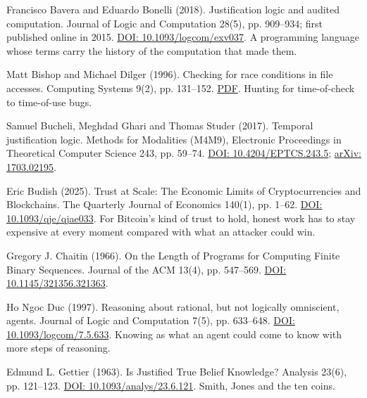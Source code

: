 \documentclass[11pt,twoside]{article}
\theoremstyle{thielethm}
\theoremstyle{thieledef}
\theoremstyle{thieledef}
\theoremstyle{thieledef}
\theoremstyle{thielethm}
\theoremstyle{thieleobs}
\theoremstyle{thielethm}
\begin{document}
\noindent Francisco Bavera and Eduardo Bonelli (2018). Justification logic and audited computation. Journal of Logic and Computation 28(5), pp. 909--934; first published online in 2015. \href{https://doi.org/10.1093/logcom/exv037}{DOI: 10.1093/logcom/exv037}. A programming language whose terms carry the history of the computation that made them.
\par\medskip

\noindent Matt Bishop and Michael Dilger (1996). Checking for race conditions in file accesses. Computing Systems 9(2), pp. 131--152. \href{https://www.usenix.org/legacy/publications/compsystems/1996/spr_bishop.pdf}{PDF}. Hunting for time-of-check to time-of-use bugs.
\par\medskip

\noindent Samuel Bucheli, Meghdad Ghari and Thomas Studer (2017). Temporal justification logic. Methods for Modalities (M4M9), Electronic Proceedings in Theoretical Computer Science 243, pp. 59--74. \href{https://doi.org/10.4204/EPTCS.243.5}{DOI: 10.4204/EPTCS.243.5}; \href{https://arxiv.org/abs/1703.02195}{arXiv: 1703.02195}.
\par\medskip

\noindent Eric Budish (2025). Trust at Scale: The Economic Limits of Cryptocurrencies and Blockchains. The Quarterly Journal of Economics 140(1), pp. 1--62. \href{https://doi.org/10.1093/qje/qjae033}{DOI: 10.1093/qje/qjae033}. For Bitcoin's kind of trust to hold, honest work has to stay expensive at every moment compared with what an attacker could win.
\par\medskip

\noindent Gregory J. Chaitin (1966). On the Length of Programs for Computing Finite Binary Sequences. Journal of the ACM 13(4), pp. 547--569. \href{https://doi.org/10.1145/321356.321363}{DOI: 10.1145/321356.321363}.
\par\medskip

\noindent Ho Ngoc Duc (1997). Reasoning about rational, but not logically omniscient, agents. Journal of Logic and Computation 7(5), pp. 633--648. \href{https://doi.org/10.1093/logcom/7.5.633}{DOI: 10.1093/logcom/7.5.633}. Knowing as what an agent could come to know with more steps of reasoning.
\par\medskip

\noindent Edmund L. Gettier (1963). Is Justified True Belief Knowledge? Analysis 23(6), pp. 121--123. \href{https://doi.org/10.1093/analys/23.6.121}{DOI: 10.1093/analys/23.6.121}. Smith, Jones and the ten coins.
\par\medskip
\end{document}
